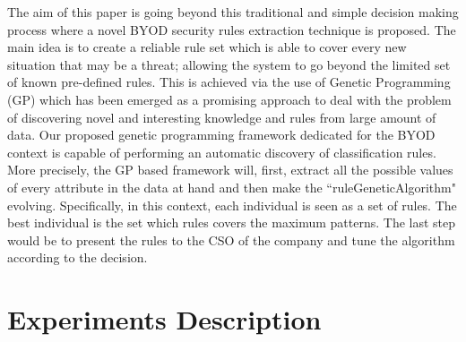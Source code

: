 \documentclass[runningheads,a4paper]{llncs}
\begin{document}
The aim of this paper is going beyond this traditional and simple
decision making process where a novel  BYOD security rules extraction
technique is proposed. The main idea is to create a reliable rule set
which is able to cover every new situation that may be a threat;
allowing the system to go beyond the limited set of known pre-defined
rules. This is achieved via the use of Genetic Programming (GP) which
has been emerged as a promising approach to deal with the problem of
discovering novel and interesting knowledge and rules from large
amount of data. Our proposed genetic programming framework dedicated
for the BYOD context is capable of performing an automatic discovery
of classification rules. More precisely, the GP based framework will,
first, extract all the possible values of every attribute in the data
at hand and then make the ``ruleGeneticAlgorithm"
evolving. Specifically, in this context, each individual is seen as a
set of rules. The best individual is the set which rules covers the
maximum patterns. The last step would be to present the rules to the
CSO of the company and tune the algorithm according to the decision. 




\section{Experiments Description}
\label{sec:experiments}



\end{document}
